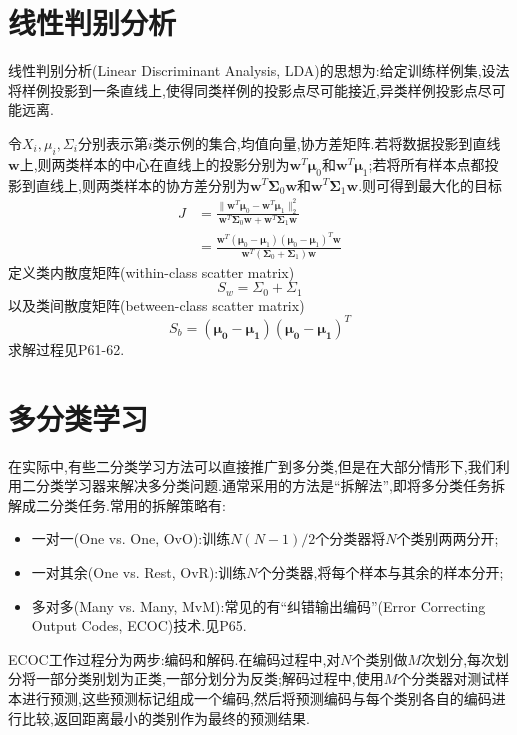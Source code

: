 \section{线性判别分析}

线性判别分析(Linear Discriminant Analysis, LDA)的思想为:给定训练样例集,设法将样例投影到一条直线上,使得同类样例的投影点尽可能接近,异类样例投影点尽可能远离.

令$X_i,\mu_i,\Sigma_i$分别表示第$i$类示例的集合,均值向量,协方差矩阵.若将数据投影到直线$\bm w$上,则两类样本的中心在直线上的投影分别为$\bm w^T\bm\mu_0$和$\bm w^T\bm\mu_1$;若将所有样本点都投影到直线上,则两类样本的协方差分别为$\bm w^T\bm\Sigma_0\bm w$和$\bm w^T\bm\Sigma_1\bm w$.则可得到最大化的目标
\begin{equation}\begin{split}
J&=\frac{\|\bm w^T\bm\mu_0-\bm w^T\bm\mu_1\|_2^2}{\bm w^T\bm\Sigma_0\bm w+\bm w^T\bm\Sigma_1\bm w}\\
&=\frac{\bm w^T(\bm\mu_0-\bm\mu_1)(\bm\mu_0-\bm\mu_1)^T\bm w}{\bm w^T(\bm\Sigma_0+\bm\Sigma_1)\bm w}
\end{split}\end{equation}
定义类内散度矩阵(within-class scatter matrix)
\begin{equation}
S_w=\Sigma_0+\Sigma_1
\end{equation}
以及类间散度矩阵(between-class scatter matrix)
\begin{equation}
S_b=\bm{(\mu_0-\mu_1)(\mu_0-\mu_1)}^T
\end{equation}
求解过程见P61-62.

\section{多分类学习}

在实际中,有些二分类学习方法可以直接推广到多分类,但是在大部分情形下,我们利用二分类学习器来解决多分类问题.通常采用的方法是``拆解法'',即将多分类任务拆解成二分类任务.常用的拆解策略有:
\begin{itemize}
\item 一对一(One vs. One, OvO):训练$N(N-1)/2$个分类器将$N$个类别两两分开;
\item 一对其余(One vs. Rest, OvR):训练$N$个分类器,将每个样本与其余的样本分开;
\item 多对多(Many vs. Many, MvM):常见的有``纠错输出编码''(Error Correcting Output Codes, ECOC)技术.见P65.
\end{itemize}

ECOC工作过程分为两步:编码和解码.在编码过程中,对$N$个类别做$M$次划分,每次划分将一部分类别划为正类,一部分划分为反类;解码过程中,使用$M$个分类器对测试样本进行预测,这些预测标记组成一个编码,然后将预测编码与每个类别各自的编码进行比较,返回距离最小的类别作为最终的预测结果.

